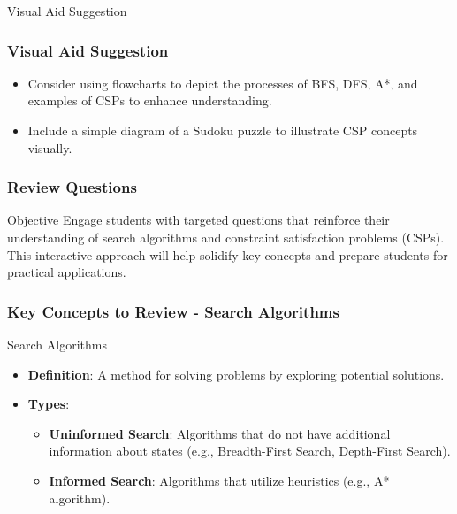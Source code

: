 \documentclass[aspectratio=169]{beamer}
\begin{document}
\begin{frame}[fragile]{Visual Aid Suggestion}
    \frametitle{Visual Aid Suggestion}
    \begin{itemize}
        \item Consider using flowcharts to depict the processes of BFS, DFS, A*, and examples of CSPs to enhance understanding.
        \item Include a simple diagram of a Sudoku puzzle to illustrate CSP concepts visually.
    \end{itemize}
\end{frame}

\begin{frame}[fragile]
    \frametitle{Review Questions}
    \begin{block}{Objective}
        Engage students with targeted questions that reinforce their understanding of search algorithms and constraint satisfaction problems (CSPs). This interactive approach will help solidify key concepts and prepare students for practical applications.
    \end{block}
\end{frame}

\begin{frame}[fragile]
    \frametitle{Key Concepts to Review - Search Algorithms}
    \begin{block}{Search Algorithms}
        \begin{itemize}
            \item \textbf{Definition}: A method for solving problems by exploring potential solutions.
            \item \textbf{Types}:
            \begin{itemize}
                \item \textbf{Uninformed Search}: Algorithms that do not have additional information about states (e.g., Breadth-First Search, Depth-First Search).
                \item \textbf{Informed Search}: Algorithms that utilize heuristics (e.g., A* algorithm).
            \end{itemize}
        \end{itemize}
    \end{block}
\end{frame}
\end{document}
